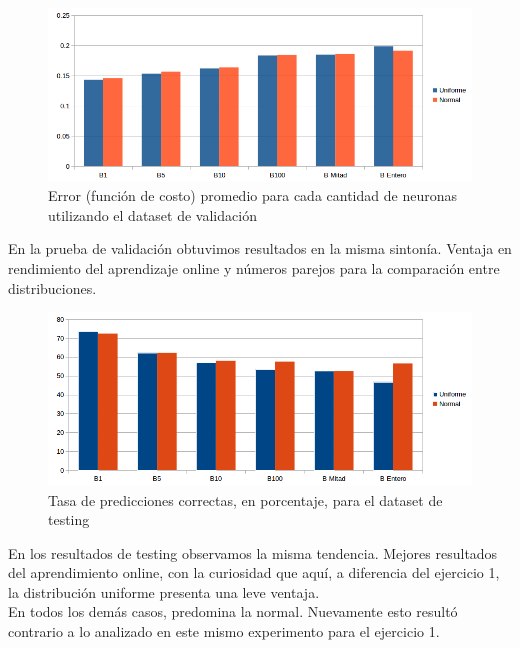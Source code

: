 \begin{figure}[h]
  \begin{center}
  \includegraphics[scale=0.65]{graficos/ej2_distribucion_error_validacion.png}
  \caption{Error (función de costo) promedio para cada cantidad de neuronas utilizando el dataset de validación}
  \end{center}
\end{figure}

En la prueba de validación obtuvimos resultados en la misma sintonía. Ventaja en rendimiento del aprendizaje online y números parejos para la comparación entre distribuciones.

\begin{figure}[h]
  \begin{center}
  \includegraphics[scale=0.65]{graficos/ej2_distribucion_eficiencia.png}
  \caption{Tasa de predicciones correctas, en porcentaje, para el dataset de testing}
  \end{center}
\end{figure}

En los resultados de testing observamos la misma tendencia. Mejores resultados del aprendimiento online, con la curiosidad que aquí, a diferencia del ejercicio 1, la distribución uniforme presenta una leve ventaja.\\
En todos los demás casos, predomina la normal. Nuevamente esto resultó contrario a lo analizado en este mismo experimento para el ejercicio 1.\\

